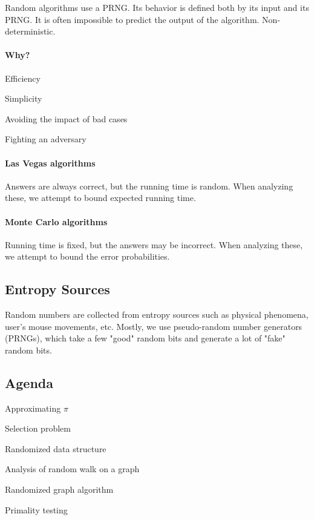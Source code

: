 \documentclass[a4paper]{article}
\newenvironment{itemize*}%
  {\begin{itemize}%
    \setlength{\itemsep}{0pt}%
    \setlength{\parsep}{0pt}%
    \setlength{\parskip}{0pt}}%
  {\end{itemize}}
\newenvironment{enumerate*}%
  {\begin{enumerate}%
    \setlength{\itemsep}{0.5pt}%
    \setlength{\parsep}{0pt}%
    \setlength{\parskip}{0pt}}%
  {\end{enumerate}}
\begin{document}
Random algorithms use a PRNG. Its behavior is defined both by its input and its PRNG. It is often impossible to predict the output of the algorithm. Non-deterministic.

\paragraph{Why?}
\begin{itemize*}
  \item Efficiency
  \item Simplicity
  \item Avoiding the impact of bad cases
  \item Fighting an adversary
\end{itemize*}

\paragraph{Las Vegas algorithms}
Answers are always correct, but the running time is random.
When analyzing these, we attempt to bound expected running time.

\paragraph{Monte Carlo algorithms}
Running time is fixed, but the answers may be incorrect.
When analyzing these, we attempt to bound the error probabilities.

\subsection{Entropy Sources}
Random numbers are collected from entropy sources such as physical phenomena, user's mouse movements, etc.
Mostly, we use pseudo-random number generators (PRNGs), which take a few "good" random bits and generate a lot of "fake" random bits.

\subsection{Agenda}
\begin{enumerate*}
  \item Approximating $\pi$
  \item Selection problem
  \item Randomized data structure
  \item Analysis of random walk on a graph
  \item Randomized graph algorithm
  \item Primality testing
\end{enumerate*}
\end{document}
